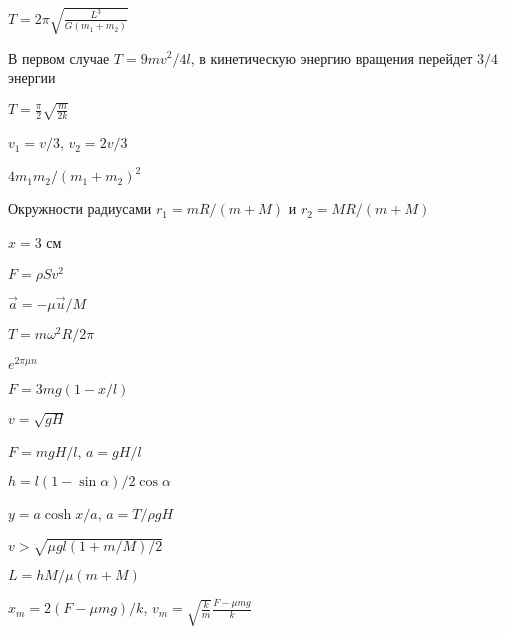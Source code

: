 \begin{Answer}{63}
$T = 2 \pi \sqrt{\frac{L^3}{G(m_1+m_2)}}$
\end{Answer}
\begin{Answer}{64}
В первом случае $T = 9mv^2 / 4l$, в кинетическую энергию вращения перейдет $3/4$ энергии
\end{Answer}
\begin{Answer}{65}
$T = \frac{\pi}{2}\sqrt{\frac{m}{2k}}$
\end{Answer}
\begin{Answer}{66}
$v_1 = v/3$, $v_2 = 2v/3$
\end{Answer}
\begin{Answer}{67}
$4m_1m_2/(m_1+m_2)^2$
\end{Answer}
\begin{Answer}{69}
Окружности радиусами $r_1 = mR/(m+M)$ и $r_2 = MR/(m+M)$
\end{Answer}
\begin{Answer}{70}
$x = 3$ см
\end{Answer}
\begin{Answer}{71}
$F = \rho S v^2$
\end{Answer}
\begin{Answer}{72}
$\vec a = - \mu \vec u / M$
\end{Answer}
\begin{Answer}{73}
$T = m\omega^2R/2 \pi$
\end{Answer}
\begin{Answer}{74}
$e^{2\pi \mu n}$
\end{Answer}
\begin{Answer}{75}
$F = 3mg(1-x/l)$
\end{Answer}
\begin{Answer}{76}
$v = \sqrt{gH}$
\end{Answer}
\begin{Answer}{77}
$F = mgH/l$, $a = gH/l$
\end{Answer}
\begin{Answer}{78}
$h = l(1 - \sin \alpha)/2 \cos \alpha$
\end{Answer}
\begin{Answer}{79}
$y = a \cosh x/a$, $a = T/\rho g H$
\end{Answer}
\begin{Answer}{80}
$v > \sqrt{\mu g l(1+m/M)/2}$
\end{Answer}
\begin{Answer}{81}
$L = hM/\mu(m+M)$
\end{Answer}
\begin{Answer}{82}
$x_m = 2(F-\mu mg)/k$, $v_m = \sqrt{\frac{k}{m}}\frac{F-\mu mg}{k}$
\end{Answer}
